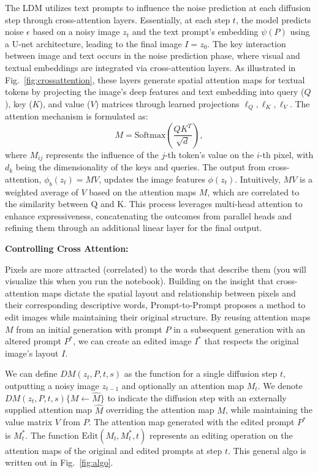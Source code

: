 \documentclass[11pt,addpoints,answers]{exam}
\begin{document}
\begin{questions}
The LDM utilizes text prompts to influence the noise prediction at each diffusion step through cross-attention layers. Essentially, at each step $t$, the model predicts noise $\epsilon$ based on a noisy image $z_t$ and the text prompt's embedding $\psi(P)$ using a U-net architecture, leading to the final image $I = z_0$. The key interaction between image and text occurs in the noise prediction phase, where visual and textual embeddings are integrated via cross-attention layers. As illustrated in Fig.~\ref{fig:crossattention}, these layers generate spatial attention maps for textual tokens by projecting the image's deep features and text embedding into query ($Q$), key ($K$), and value ($V$) matrices through learned projections $\ell_Q, \ell_K, \ell_V$. The attention mechanism is formulated as:
\begin{equation}
M = \text{Softmax} \left( \frac{QK^T}{\sqrt{d}} \right),
\end{equation}
where $M_{ij}$ represents the influence of the $j$-th token's value on the $i$-th pixel, with $d_k$ being the dimensionality of the keys and queries. The output from cross-attention, $\phi_b(z_t) = MV$, updates the image features $\phi(z_t)$. Intuitively, $MV$ is a weighted average of $V$ based on the attention maps $M$, which are correlated to the similarity between Q and K. This process leverages multi-head attention to enhance expressiveness, concatenating the outcomes from parallel heads and refining them through an additional linear layer for the final output.

\textbf{Controlling Cross Attention:} 

Pixels are more attracted (correlated) to the words that describe them (you will visualize this when you run the notebook).
Building on the insight that cross-attention maps dictate the spatial layout and relationship between pixels and their corresponding descriptive words, Prompt-to-Prompt proposes a method to edit images while maintaining their original structure. By reusing attention maps $M$ from an initial generation with prompt $P$ in a subsequent generation with an altered prompt $P^*$, we can create an edited image $I^*$ that respects the original image's layout $I$.

We can define $DM(z_t, P, t, s)$ as the function for a single diffusion step $t$, outputting a noisy image $z_{t-1}$ and optionally an attention map $M_t$. We denote $DM(z_t, P, t, s)\{M \leftarrow \hat{M}\}$ to indicate the diffusion step with an externally supplied attention map $\hat{M}$ overriding the attention map \( M \), while maintaining the value matrix $V$ from $P$. The attention map generated with the edited prompt $P^*$ is $M_t^*$. The function $\text{Edit}(M_t, M_t^*, t)$ represents an editing operation on the attention maps of the original and edited prompts at step $t$. This general algo is written out in Fig.~\ref{fig:algo}.


\end{questions}
\end{document}
